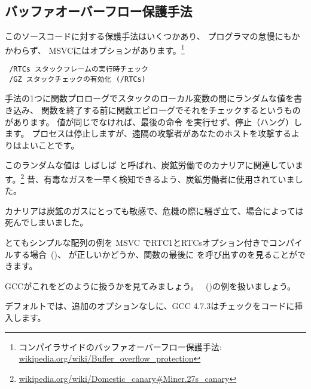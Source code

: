 ﻿\subsection{バッファオーバーフロー保護手法}
\label{subsec:BO_protection}

このソースコードに対する保護手法はいくつかあり、 \CCpp プログラマの怠慢にもかかわらず、
MSVCにはオプションがあります。\footnote{コンパイラサイドのバッファオーバーフロー保護手法:
\href{http://go.yurichev.com/17133}{wikipedia.org/wiki/Buffer\_overflow\_protection}}

\begin{lstlisting}
 /RTCs スタックフレームの実行時チェック
 /GZ スタックチェックの有効化 (/RTCs)
\end{lstlisting}


手法の1つに関数プロローグでスタックのローカル変数の間にランダムな値を書き込み、
関数を終了する前に関数エピローグでそれをチェックするというものがあります。
値が同じでなければ、最後の命令 \RET を実行せず、停止（ハング）します。
プロセスは停止しますが、遠隔の攻撃者があなたのホストを攻撃するよりはよいことです。

\newcommand{\CANARYURL}{\href{http://go.yurichev.com/17134}{wikipedia.org/wiki/Domestic\_canary\#Miner.27s\_canary}}


このランダムな値は しばしば  と呼ばれ、炭鉱労働でのカナリアに関連しています。\footnote{\CANARYURL}
昔、有毒なガスを一早く検知できるよう、炭鉱労働者に使用されていました。

カナリアは炭鉱のガスにとっても敏感で、危機の際に騒ぎ立て、場合によっては死んでしまいました。

とてもシンプルな配列の例を \ac{MSVC} でRTC1とRTCsオプション付きでコンパイルする場合~()、
が正しいかどうか、関数の最後に  を呼び出すのを見ることができます。

GCCがこれをどのように扱うかを見てみましょう。
~()の例を扱いましょう。



デフォルトでは、追加のオプションなしに、GCC 4.7.3はチェックをコードに挿入します。




